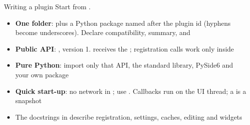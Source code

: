
\begin{standardframe}{Writing a plugin}
	\small
	Start from \href{https://github.com/stpalan/slidemage-plugin-template}{}.
	\par\medskip
	\begin{itemize}
		\item \textbf{One folder}:  plus a Python package named after the plugin id (hyphens become underscores). Declare compatibility, summary,  and 
		\item \textbf{Public API}: , version 1.  receives the ; registration calls work only inside 
		\item \textbf{Pure Python}: import only that API, the standard library, PySide6 and your own package
		\item \textbf{Quick start-up}: no network in ; use . Callbacks run on the UI thread; a  is a snapshot
		\item The docstrings in  describe registration, settings, caches, editing and widgets
	\end{itemize}
\end{standardframe}
